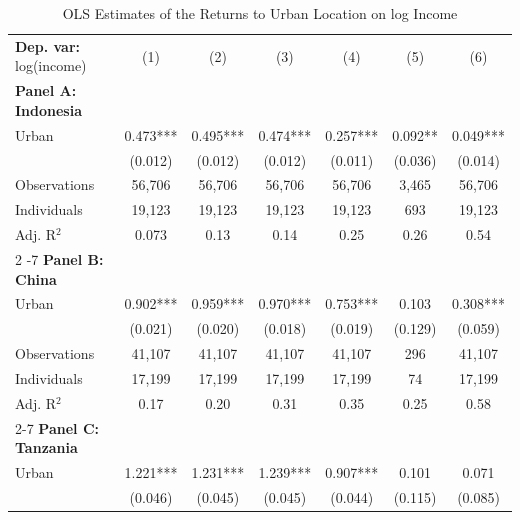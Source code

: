\begin{table}[htbp] \centering \begin{threeparttable}
 \caption{OLS Estimates of the Returns to Urban Location on log Income} 
 \label{tab:OLS_income_urban_unb} 
\begin{tabular}{l cccccc} \toprule  \textbf{Dep. var:}  log(income) 
                    &\multicolumn{1}{c}{(1)}   &\multicolumn{1}{c}{(2)}   &\multicolumn{1}{c}{(3)}   &\multicolumn{1}{c}{(4)}   &\multicolumn{1}{c}{(5)}   &\multicolumn{1}{c}{(6)}   \\
\textbf{Panel A: Indonesia} \\
Urban               &       0.473***&       0.495***&       0.474***&       0.257***&       0.092** &       0.049***\\
                    &     (0.012)   &     (0.012)   &     (0.012)   &     (0.011)   &     (0.036)   &     (0.014)   \\
\addlinespace
Observations        &      56,706   &      56,706   &      56,706   &      56,706   &       3,465   &      56,706   \\
Individuals         &      19,123   &      19,123   &      19,123   &      19,123   &         693   &      19,123   \\
Adj. R$^{2}$        &       0.073   &        0.13   &        0.14   &        0.25   &        0.26   &        0.54   \\
\cmidrule{2 -7}
\textbf{Panel B: China} \\
Urban               &       0.902***&       0.959***&       0.970***&       0.753***&       0.103   &       0.308***\\
                    &     (0.021)   &     (0.020)   &     (0.018)   &     (0.019)   &     (0.129)   &     (0.059)   \\
\addlinespace
Observations        &      41,107   &      41,107   &      41,107   &      41,107   &         296   &      41,107   \\
Individuals         &      17,199   &      17,199   &      17,199   &      17,199   &          74   &      17,199   \\
Adj. R$^{2}$        &        0.17   &        0.20   &        0.31   &        0.35   &        0.25   &        0.58   \\
\cmidrule{2-7}
\textbf{Panel C: Tanzania} \\
Urban               &       1.221***&       1.231***&       1.239***&       0.907***&       0.101   &       0.071   \\
                    &     (0.046)   &     (0.045)   &     (0.045)   &     (0.044)   &     (0.115)   &     (0.085)   \\

\end{tabular}
\end{threeparttable}
\end{table}
